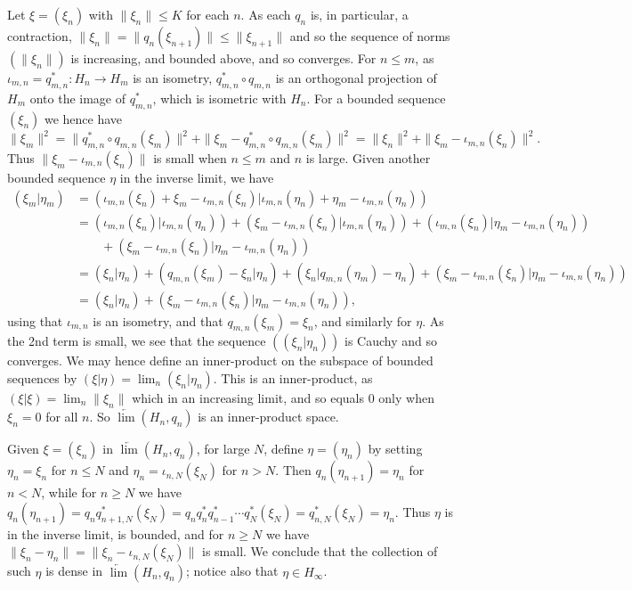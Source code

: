 \documentclass[twoside,a4paper,12pt]{article}
\theoremstyle{plain}
\theoremstyle{definition}
\begin{document}
Let $\xi=(\xi_n)$ with $\|\xi_n\|\leq K$ for each $n$.  As each $q_n$ is, in particular, a contraction, $\|\xi_n\| = \|q_n(\xi_{n+1})\| \leq \|\xi_{n+1}\|$ and so the sequence of norms $(\|\xi_n\|)$ is increasing, and bounded above, and so converges.
For $n\leq m$, as $\iota_{m,n} = q_{m,n}^* \colon H_n \to H_m$ is an isometry, $q_{m,n}^* \circ q_{m,n}$ is an orthogonal projection of $H_m$ onto the image of $q_{m,n}^*$, which is isometric with $H_n$.  For a bounded sequence $(\xi_n)$ we hence have
\[ \|\xi_m\|^2 = \| q_{m,n}^* \circ q_{m,n}(\xi_m) \|^2 + \| \xi_m - q_{m,n}^* \circ q_{m,n}(\xi_m) \|^2 = \|\xi_n\|^2 + \| \xi_m - \iota_{m,n}(\xi_n) \|^2. \]
Thus $\| \xi_m - \iota_{m,n}(\xi_n) \|$ is small when $n\leq m$ and $n$ is large.  Given another bounded sequence $\eta$ in the inverse limit, we have
\begin{align*}
(\xi_m|\eta_m)
&= ( \iota_{m,n}(\xi_n) + \xi_m - \iota_{m,n}(\xi_n) | \iota_{m,n}(\eta_n) + \eta_m - \iota_{m,n}(\eta_n)  ) \\
&= ( \iota_{m,n}(\xi_n) | \iota_{m,n}(\eta_n) ) 
   + ( \xi_m - \iota_{m,n}(\xi_n) | \iota_{m,n}(\eta_n) )
   + ( \iota_{m,n}(\xi_n) | \eta_m - \iota_{m,n}(\eta_n) ) \\
   &\qquad + ( \xi_m - \iota_{m,n}(\xi_n) | \eta_m - \iota_{m,n}(\eta_n) ) \\
&= ( \xi_n | \eta_n ) 
   + ( q_{m,n}(\xi_m) - \xi_n | \eta_n )
   + ( \xi_n | q_{m,n}(\eta_m) - \eta_n )
   + ( \xi_m - \iota_{m,n}(\xi_n) | \eta_m - \iota_{m,n}(\eta_n) ) \\
&= ( \xi_n | \eta_n ) 
   + ( \xi_m - \iota_{m,n}(\xi_n) | \eta_m - \iota_{m,n}(\eta_n) ),
\end{align*}
using that $\iota_{m,n}$ is an isometry, and that $q_{m,n}(\xi_m) = \xi_n$, and similarly for $\eta$.  As the 2nd term is small, we see that the sequence $((\xi_n|\eta_n))$ is Cauchy and so converges.  We may hence define an inner-product on the subspace of bounded sequences by $(\xi|\eta) = \lim_n (\xi_n|\eta_n)$.  This is an inner-product, as $(\xi|\xi) = \lim_n \|\xi_n\|$ which in an increasing limit, and so equals $0$ only when $\xi_n=0$ for all $n$.  So  $\underleftarrow{\lim} (H_n, q_n)$ is an inner-product space.

Given $\xi = (\xi_n)$ in $\underleftarrow{\lim} (H_n, q_n)$, for large $N$, define $\eta = (\eta_n)$ by setting $\eta_n=\xi_n$ for $n\leq N$ and $\eta_n = \iota_{n,N}(\xi_N)$ for $n>N$.  Then $q_n(\eta_{n+1}) = \eta_n$ for $n<N$, while for $n\geq N$ we have $q_n(\eta_{n+1}) = q_n q_{n+1,N}^*(\xi_N) = q_n q_n^* q_{n-1}^* \cdots q_N^*(\xi_N) = q_{n,N}^*(\xi_N) = \eta_n$.  Thus $\eta$ is in the inverse limit, is bounded, and for $n\geq N$ we have $\|\xi_n - \eta_n\| = \|\xi_n - \iota_{n,N}(\xi_N)\|$ is small.  We conclude that the collection of such $\eta$ is dense in $\underleftarrow{\lim} (H_n, q_n)$; notice also that $\eta\in H_\infty$.
\end{document}
